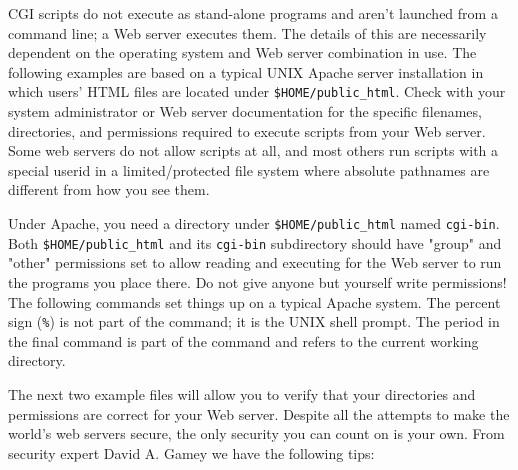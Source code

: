 CGI scripts do not execute as stand-alone programs and
aren't launched from a command line; a Web server
executes them. The details of this are necessarily dependent on the
operating system and Web server combination in use. The following
examples are based on a typical UNIX Apache server installation in
which users' HTML files are located under
\texttt{\$HOME/public\_html}. Check with your system administrator or
Web server documentation for the specific filenames, directories, and
permissions required to execute scripts from your Web server. Some web
servers do not allow scripts at all, and most others run scripts with a
special userid in a limited/protected file system where absolute
pathnames are different from how you see them.

Under Apache, you need a directory under
\texttt{\$HOME/public\_html} named \texttt{cgi-bin}. Both
\texttt{\$HOME/public\_html} and its \texttt{cgi-bin} subdirectory
should have "group" and
"other" permissions set to allow
reading and executing for the Web server to run the programs you place
there. Do not give anyone but yourself write permissions! The following
commands set things up on a typical Apache system. The percent sign
(\texttt{\%}) is not part of the command; it is the UNIX shell prompt.
The period in the final command is part of the command and refers to
the current working directory.


The next two example files will allow you to verify that your
directories and permissions are correct for your Web server.
Despite all the attempts to make the world's web servers secure,
the only security you can count on is your own. From security expert
David A. Gamey we have the following tips:

